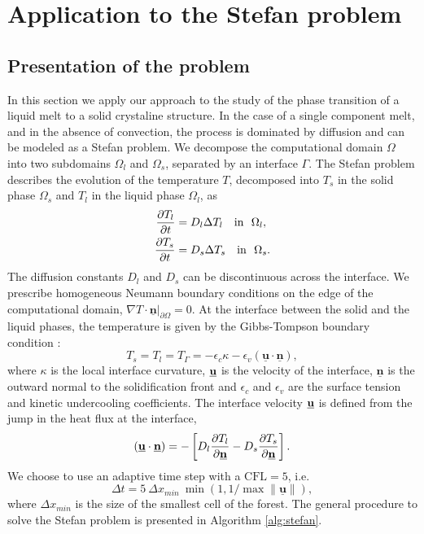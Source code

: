 \section{Application to the Stefan problem} \label{sec:application}

\subsection{Presentation of the problem}

In this section we apply our approach to the study of the phase transition of a liquid melt to a solid crystaline structure. In the case of a single component melt, and in the absence of convection, the process is dominated by diffusion and can be modeled as a Stefan problem. We decompose the computational domain $\Omega$ into two subdomains $\Omega_l$ and $\Omega_s$, separated by an interface $\Gamma$. The Stefan problem describes the evolution of the temperature $T$, decomposed into $T_s$ in the solid phase $\Omega_s$ and $T_l$ in the liquid phase $\Omega_l$, as
\begin{align}
\frac{\partial T_l}{\partial t} & = D_l \Delta T_l \quad \mathrm{in} ~~ \Omega_l, \label{eq:stefan_heat_equation_l} \\
\frac{\partial T_s}{\partial t} & = D_s \Delta T_s \quad \mathrm{in} ~~ \Omega_s. \label{eq:stefan_heat_equation_s}
\end{align}
The diffusion constants $D_l$ and $D_s$ can be discontinuous across the interface. We prescribe homogeneous Neumann boundary conditions on the edge of the computational domain, $\nabla T \cdot \underline{\mathbf{n}}\vert_{\partial \Omega}=0$. At the interface between the solid and the liquid phases, the temperature is given by the Gibbs-Tompson boundary condition \cite{Alexiades;Solomon;Wilson:88:The-formation-of-a-s, Alexiades;Solomon:93:Mathematical-Modelin}:
\begin{equation} \label{eq:stefan_gibbs_tompson}
T_s = T_l = T_{\Gamma} = -\epsilon_c \kappa - \epsilon_v (\underline{\mathbf{u}} \cdot \underline{\mathbf{n}}),
\end{equation}
where $\kappa$ is the local interface curvature, $\underline{\mathbf{u}}$ is the velocity of the interface, $\underline{\mathbf{n}}$ is the outward normal to the solidification front and $\epsilon_c$ and $\epsilon_v$ are the surface tension and kinetic undercooling coefficients. The interface velocity $\underline{\mathbf{u}}$ is defined from the jump in the heat flux at the interface,
\begin{equation} \label{eq:stefan_velocity}
(\underline{\mathbf{u}} \cdot \underline{\mathbf{n}}) = - \left[ D_l \frac{\partial T_l}{\partial \underline{\mathbf{n}}} - D_s \frac{\partial T_s}{\partial \underline{\mathbf{n}}} \right].
\end{equation}
We choose to use an adaptive time step with a $\text{CFL} = 5$, i.e.
\begin{equation} \label{eq:stefan_dt}
\Delta t = 5 ~ \Delta x_{min} ~ \min(1,1/\max \lVert \underline{\mathbf{u}} \rVert),
\end{equation}
where $\Delta x_{min}$ is the size of the smallest cell of the forest. The general procedure to solve the Stefan problem is presented in Algorithm \ref{alg:stefan}.

